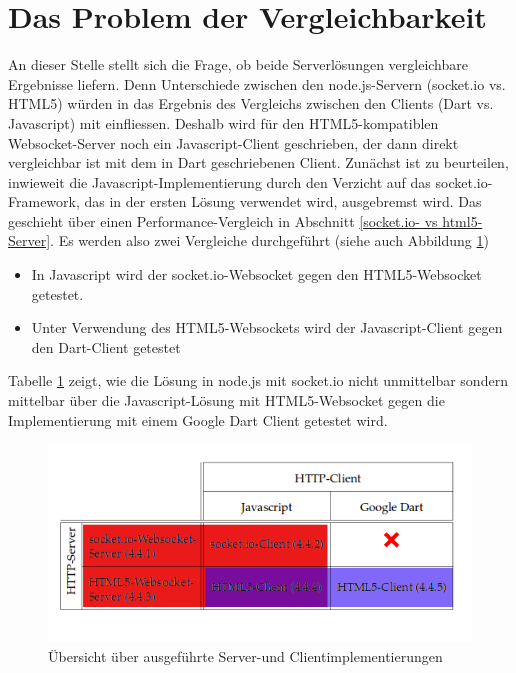\section{Das Problem der Vergleichbarkeit}\label{Vergleichbarkeit}
An dieser Stelle stellt sich die Frage, ob beide Serverlösungen vergleichbare Ergebnisse liefern. Denn Unterschiede zwischen den node.js-Servern (socket.io vs. HTML5) würden in das Ergebnis des Vergleichs zwischen den Clients (Dart vs. Javascript) mit einfliessen. Deshalb wird für den HTML5-kompatiblen Websocket-Server noch ein Javascript-Client geschrieben, der dann direkt vergleichbar ist mit dem in Dart geschriebenen Client.
Zunächst ist zu beurteilen, inwieweit die Javascript-Implementierung durch den Verzicht auf das socket.io-Framework, das in der ersten Lösung verwendet wird, ausgebremst wird. Das geschieht über einen Performance-Vergleich in Abschnitt \ref {socket.io- vs html5-Server}.
Es werden also zwei Vergleiche durchgeführt (siehe auch Abbildung \ref{tab:uebersicht}) 
\begin{itemize}
\item In Javascript wird der socket.io-Websocket gegen den HTML5-Websocket getestet.
\item Unter Verwendung des HTML5-Websockets wird der Javascript-Client gegen den Dart-Client getestet
\end{itemize}
Tabelle \ref{tab:uebersicht} zeigt, wie die Lösung in node.js mit socket.io nicht unmittelbar sondern mittelbar über die Javascript-Lösung mit HTML5-Websocket gegen die Implementierung mit einem Google Dart Client getestet wird.
\begin{figure}[H]
  \centering
  \includegraphics[width=6in]{images/tabelleblaurot.png}
  \caption[Übersicht über ausgeführte Server-und Clientimplementierungen]{Übersicht über ausgeführte Server-und Clientimplementierungen}
  \label{tab:uebersicht}
\end{figure}

